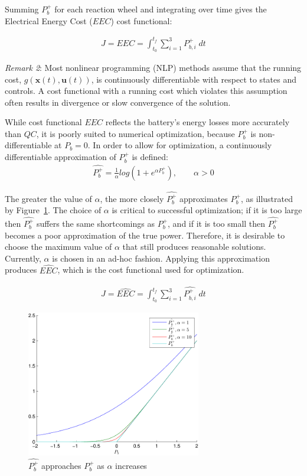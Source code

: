 \documentclass[letterpaper, paper,11pt]{AAS}
\begin{document}
\noindent Summing $P_b^+$ for each reaction wheel and integrating over time gives the Electrical Energy Cost ($EEC$) cost functional:

\begin{align}
J = EEC = \int_{t_{0}}^{t_{f}} \sum_{i = 1}^{3}P_{b,i}^+ \; dt
\end{align}

\noindent \textit{Remark 2}: Most nonlinear programming (NLP) methods assume that the running cost, $g(\pmb{x}(t),\pmb{u}(t))$, is continuously differentiable with respect to states and controls. A cost functional with a running cost which violates this assumption often results in divergence or slow convergence of the solution.\cite{Betts2010}

\noindent While cost functional $EEC$ reflects the battery's energy losses more accurately than $QC$, it is poorly suited to numerical optimization, because $P_b^+$ is non-differentiable at $P_b = 0$. In order to allow for optimization, a continuously differentiable approximation of $P_b^+$ is defined:
\begin{align}
\hat{P_b^+} = \frac{1}{\alpha}log(1+e^{\alpha P_b^+}), \qquad \alpha > 0
\end{align}

The greater the value of $\alpha$, the more closely $\hat{P_b^+}$ approximates $P_b^+$, as illustrated by Figure~\ref{f:Phat}. The choice of $\alpha$ is critical to successful optimization; if it is too large then $\hat{P_b^+}$ suffers the same shortcomings as $P_b^+$, and if it is too small then $\hat{P_b^+}$ becomes a poor approximation of the true power. Therefore, it is desirable to choose the maximum value of $\alpha$ that still produces reasonable solutions.  Currently, $\alpha$ is chosen in an ad-hoc fashion. Applying this approximation produces $\hat{EEC}$, which is the cost functional used for optimization.

\begin{align}
J = \hat{EEC} = \int_{t_{0}}^{t_{f}} \sum_{i = 1}^{3}\hat{P_{b,i}^+} \; dt
\end{align}

\begin{figure}[H]%
\centering
 \includegraphics[width = 3in]{cfapprox}
 \caption{$\hat{P_b^+}$ approaches $P_b^+$ as $\alpha$ increases}
 \label{f:Phat}
\end{figure}
\end{document}
